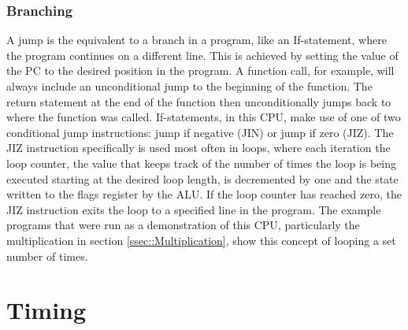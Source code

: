 \subsubsection{Branching}
A jump is the equivalent to a branch in a program, like an If-statement, where the program continues on a different line. This is achieved by setting the value of the PC to the desired position in the program. A function call, for example, will always include an unconditional jump to the beginning of the function. The return statement at the end of the function then unconditionally jumps back to where the function was called. If-statements, in this CPU, make use of one of two conditional jump instructions: jump if negative (JIN) or jump if zero (JIZ). The JIZ instruction specifically is used most often in loops, where each iteration the loop counter, the value that keeps track of the number of times the loop is being executed starting at the desired loop length, is decremented by one and the state written to the flags register by the ALU. If the loop counter has reached zero, the JIZ instruction exits the loop to a specified line in the program. The example programs that were run as a demonstration of this CPU, particularly the multiplication in section \ref{ssec::Multiplication}, show this concept of looping a set number of times.

\section{Timing}


